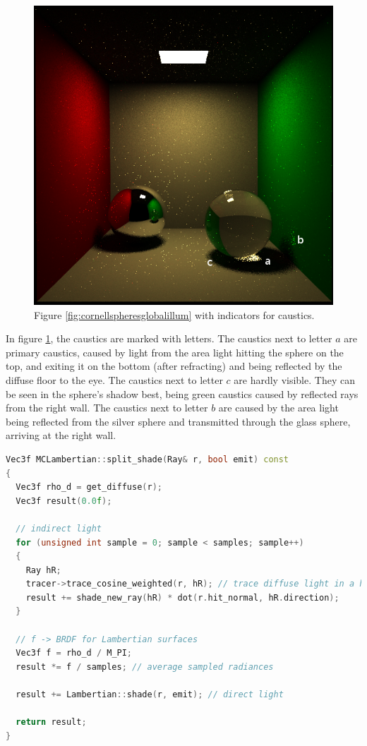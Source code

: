 \begin{figure}[h]
	\centering
	\includegraphics[width=\textwidth]{week5/cornellrightsphere_25_95s_5spp_9rpp_caustics.png}
	\caption{Figure \ref{fig:cornellspheresglobalillum} with indicators for caustics.}
	\label{fig:cornellspherecaustics}
\end{figure}

In figure \ref{fig:cornellspherecaustics}, the caustics are marked with letters. The caustics next to letter $a$ are primary caustics, caused by light from the area light hitting the sphere on the top, and exiting it on the bottom (after refracting) and being reflected by the diffuse floor to the eye.
The caustics next to letter $c$ are hardly visible. They can be seen in the sphere's shadow best, being green caustics caused by reflected rays from the right wall. 
The caustics next to letter $b$ are caused by the area light being reflected from the silver sphere and transmitted through the glass sphere, arriving at the right wall.
\begin{lstlisting}[language=C++,caption=MCLambertian::split\_shade,label=lst:mclambertian::splitshade,firstnumber=73]
Vec3f MCLambertian::split_shade(Ray& r, bool emit) const
{
  Vec3f rho_d = get_diffuse(r);
  Vec3f result(0.0f);

  // indirect light
  for (unsigned int sample = 0; sample < samples; sample++)
  { 
    Ray hR; 
    tracer->trace_cosine_weighted(r, hR); // trace diffuse light in a hemisphere
    result += shade_new_ray(hR) * dot(r.hit_normal, hR.direction);
  }
     
  // f -> BRDF for Lambertian surfaces
  Vec3f f = rho_d / M_PI;
  result *= f / samples; // average sampled radiances

  result += Lambertian::shade(r, emit); // direct light

  return result;
}
\end{lstlisting}


